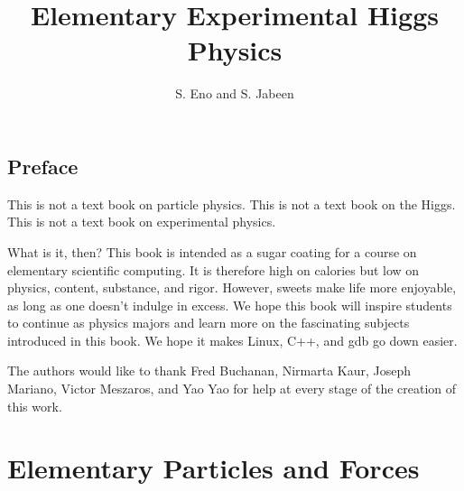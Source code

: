 \documentclass[11pt,fleqn]{book} %
\title{Elementary Experimental Higgs Physics}
\author{S. Eno and S. Jabeen}
\begin{document}
\maketitle
{}
\cftbeforetoctitleskip
\setlength{\cftbeforetoctitleskip}{}
\tableofcontents

\newpage
\section*{Preface}
This is not a text book on particle physics.  This is not a text book on the Higgs.  This is not a text book on experimental physics.


What is it, then?  This book is intended as a sugar coating for a course on elementary scientific computing.  It is therefore high on calories but low on
physics, content, substance, and rigor.  However, sweets make life more enjoyable, as long as one doesn't indulge in excess.  We hope this book will inspire students to continue as physics majors and learn more on the fascinating subjects introduced in this book.  We hope it makes Linux, C++, and gdb go down easier.


The authors would like to thank Fred Buchanan, Nirmarta Kaur, Joseph Mariano, Victor Meszaros, and Yao Yao for help at every stage of the creation of this work.




\pagestyle{fancy} %



\chapter{Elementary Particles and Forces}

\end{document}
